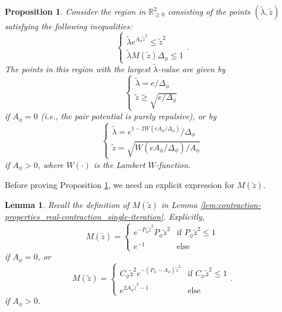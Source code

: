 \documentclass[11pt]{article}
\newcommand{\R}{\mathbb R}
\newcommand{\pwcc}{\Delta_{\phi}}
\newcommand{\tl}{\tilde{\lambda}}
\newcommand{\tz}{\tilde{z}}
\newcommand{\aconst}{A_{\phi}}
\newcommand{\pconst}{P_{\phi}}
\numberwithin{equation}{section}
\theoremstyle{plain}
\newtheorem{lemma}[theorem]{Lemma}
\newtheorem{proposition}[theorem]{Proposition}
\theoremstyle{definition}
\theoremstyle{remark}
\begin{document}
\begin{proposition}
\label{prop:contraction-properties_optimization-problem}
Consider the region in $\R^{2}_{\ge 0}$ consisting of the points $(\tilde{\lambda},\tilde{z})$ satisfying the following inequalities:
\begin{equation}
\label{eqn:contraction-properties_optimization-problem}
\begin{cases}
\tl e^{\aconst\tz^{2}}\le\tz^{2} \\
\tl M(\tz)\pwcc\le 1
\end{cases}.
\end{equation}
The points in this region with the largest $\tilde{\lambda}$-value are given by
\begin{equation}
\label{eqn:contraction-properties_optimization-problem_repulsive-optimizer}
\begin{cases}
\tilde{\lambda}=e/\pwcc
\\
\tilde{z}\ge \sqrt{e/\pwcc}
\end{cases}
\end{equation}
if $\aconst=0$ (i.e., the pair potential is purely repulsive), or by
\begin{equation}
\label{eqn:contraction-properties_optimization-problem_locally-stable-optimizer}
\begin{cases}
\tilde{\lambda}=e^{1-2W(e\aconst/\pwcc)}/\pwcc
\\
\tilde{z}=\sqrt{W(e\aconst/\pwcc)/\aconst}
\end{cases}
\end{equation}
if $\aconst>0$, where $W(\cdot)$ is the Lambert $W$-function.
\end{proposition}

Before proving Proposition \ref{prop:contraction-properties_optimization-problem}, we need an explicit expression for $M(\tz)$.

\begin{lemma}
\label{eqn:contraction-properties_optimization-problem_M}
Recall the definition of $M(\tz)$ in Lemma \ref{lem:contraction-properties_real-contraction_single-iteration}.
Explicitly,
\begin{equation}
\label{eqn:contraction-properties_optimization-problem_M_repulsive}
M(\tilde{z})=
\begin{cases}
e^{-\pconst\tilde{z}^{2}}\pconst\tilde{z}^{2} & \text{if }\pconst\tilde{z}^{2}\le 1
\\
e^{-1} & \text{else}
\end{cases}
\end{equation}
if $\aconst=0$, or 
\begin{equation}
\label{eqn:contraction-properties_optimization-problem_M_locally-stable}
M(\tilde{z})=
\begin{cases}
C_{\phi}\tz^{2}e^{-(\pconst-\aconst)\tz^{2}} & \text{if }C_{\phi}\tilde{z}^{2}\le 1
\\
e^{2\aconst\tz^{2}-1} & \text{else}
\end{cases}.
\end{equation}
if $\aconst>0$.
\end{lemma}
\end{document}
